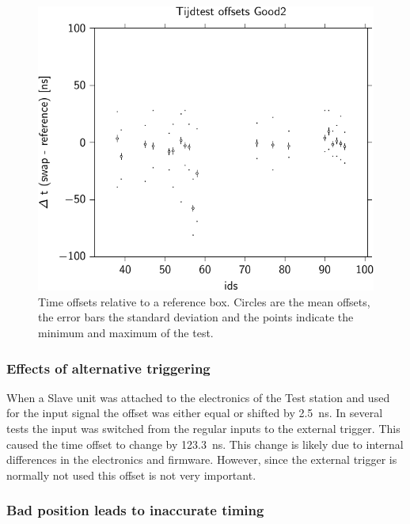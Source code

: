 \begin{figure}
    \centering
    \includegraphics{plots/cluster/hisparc_offsets}
    \caption{Time offsets relative to a reference box. Circles are the
             mean offsets, the error bars the standard deviation and the
             points indicate the minimum and maximum of the test.}
    \label{fig:hisparc_offsets}
\end{figure}


\subsubsection{Effects of alternative triggering}

When a Slave unit was attached to the electronics of the Test station and used for the input signal the offset was either equal or shifted by \SI{2.5}{\ns}. In several tests the input was switched from the regular \pmt inputs to the external trigger. This caused the time offset to change by \SI{123.3}{\ns}. This change is likely due to internal differences in the electronics and firmware. However, since the external trigger is normally not used this offset is not very important.

\subsubsection{Bad position leads to inaccurate timing}

